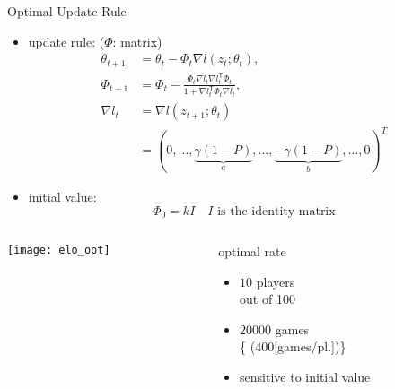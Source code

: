 \documentclass[fleqn,aspectratio=1610]{beamer}
\begin{document}
\begin{frame}[label={sec:orgb04a666}]{Optimal Update Rule}
\begin{itemize}
\item update rule: (\(\varPhi\): matrix)
\begin{align}
  \theta_{t+1}
  &=\theta_{t}-\varPhi_{t}\nabla l(z_{t};\theta_{t}),\\
  \varPhi_{t+1}
  &=
    \varPhi_{t}
    -\frac{\varPhi_{t}\nabla l_{t}\nabla l_{t}^{\mathsf{T}}\varPhi_{t}}
    {1+\nabla l_{t}^{\mathsf{T}}\varPhi_{t}\nabla l_{t}},\\
  \nabla l_{t}
  &=\nabla l(z_{t+1};\theta_{t})\\	 
  &=(0,\dotsc,\underbrace{\gamma(1-P)}_{a},\dotsc,
    \underbrace{-\gamma(1-P)}_{b},\dotsc,0)^{T}
\end{align}
\item initial value:
\begin{equation}
  \varPhi_{0}=k I\quad \text{\(I\) is the identity matrix}
\end{equation}
\end{itemize}
\end{frame}
\begin{frame}[label={sec:orga3ac1a8}]{}
\begin{columns}
\begin{column}{0.65\columnwidth}
\begin{center}
  \texttt{[image: elo\_opt]}%
\end{center}
\end{column}
\begin{column}{0.35\columnwidth}
optimal rate
\begin{itemize}
\item \(10\) players\\
out of 100
\item \(20000\) games\\
\{\small
  (\(400\){[}games/pl.])\}
\item sensitive to initial value
\end{itemize}
\end{column}
\end{columns}
\end{frame}
\end{document}
